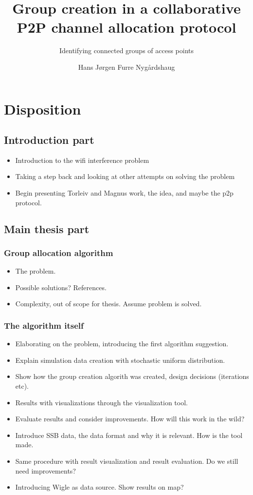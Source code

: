 \documentclass[a4paper,UKenglish]{report}
\title{Group creation in a collaborative P2P channel allocation protocol}
\subtitle{Identifying connected groups of access points}
\author{Hans Jørgen Furre Nygårdshaug}
\begin{document}
\duoforside[dept={Institutt for informatikk},
  program={Informatikk: programmering og nettverk},
  long]

\tableofcontents
\chapter{Disposition} 
\section {Introduction part}
\begin{itemize} 
	\item Introduction to the wifi interference problem
	\item Taking a step back and looking at other attempts on solving the problem
	\item Begin presenting Torleiv and Magnus work, the idea, and maybe the p2p protocol.
\end{itemize}

\section {Main thesis part}
\subsection{Group allocation algorithm} 

\begin{itemize} 
	\item The problem.
	\item Possible solutions? References.
	\item Complexity, out of scope for thesis. Assume problem is solved.
\end{itemize} 
\subsection{The algorithm itself} 
\begin{itemize} 
	\item Elaborating on the problem, introducing the first algorithm suggestion.
	\item Explain simulation data creation with stochastic uniform distribution.
	\item Show how the group creation algorith was created, design decisions (iterations etc).
	\item Results with visualizations through the visualization tool. 
	\item Evaluate results and consider improvements. How will this work in the wild?
	\item Introduce SSB data, the data format and why it is relevant. How is the tool made.
	\item Same procedure with result visualization and result evaluation. Do we still need improvements?
	\item Introducing Wigle as data source. Show results on map?
\end{itemize}
\end{document}
